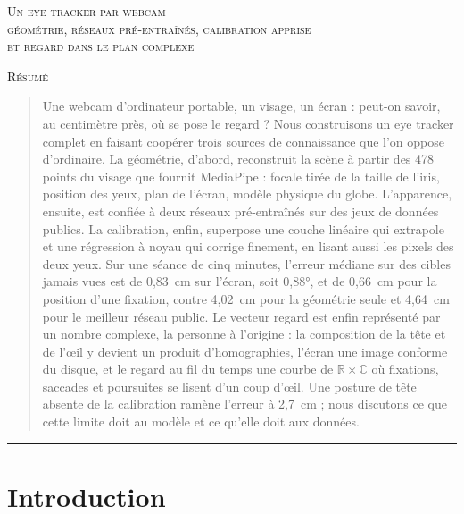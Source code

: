 \documentclass[10pt,a4paper]{article}
\newcommand{\R}{\mathbb{R}}
\newcommand{\C}{\mathbb{C}}
\begin{document}
\thispagestyle{empty}

\vspace*{1.2cm}
\begin{center}
{\Large\scshape Un eye tracker par webcam}\\[1ex]
{\normalsize\scshape géométrie, réseaux pré-entraînés, calibration apprise\\et regard dans le plan complexe}

\vspace{1.3cm}
{\small\scshape Résumé}
\end{center}
\vspace{-0.6ex}
\begin{quote}\small
Une webcam d'ordinateur portable, un visage, un écran : peut-on savoir, au centimètre près, où se pose le regard ? Nous construisons un eye tracker complet en faisant coopérer trois sources de connaissance que l'on oppose d'ordinaire. La géométrie, d'abord, reconstruit la scène à partir des 478 points du visage que fournit MediaPipe : focale tirée de la taille de l'iris, position des yeux, plan de l'écran, modèle physique du globe. L'apparence, ensuite, est confiée à deux réseaux pré-entraînés sur des jeux de données publics. La calibration, enfin, superpose une couche linéaire qui extrapole et une régression à noyau qui corrige finement, en lisant aussi les pixels des deux yeux. Sur une séance de cinq minutes, l'erreur médiane sur des cibles jamais vues est de 0,83~cm sur l'écran, soit 0,88°, et de 0,66~cm pour la position d'une fixation, contre 4,02~cm pour la géométrie seule et 4,64~cm pour le meilleur réseau public. Le vecteur regard est enfin représenté par un nombre complexe, la personne à l'origine : la composition de la tête et de l'œil y devient un produit d'homographies, l'écran une image conforme du disque, et le regard au fil du temps une courbe de $\R\times\C$ où fixations, saccades et poursuites se lisent d'un coup d'œil. Une posture de tête absente de la calibration ramène l'erreur à 2,7~cm ; nous discutons ce que cette limite doit au modèle et ce qu'elle doit aux données.
\end{quote}

\vspace{0.5cm}
\begin{center}\rule{3cm}{0.4pt}\end{center}
\vspace{0.3cm}

\section{Introduction}
\end{document}
